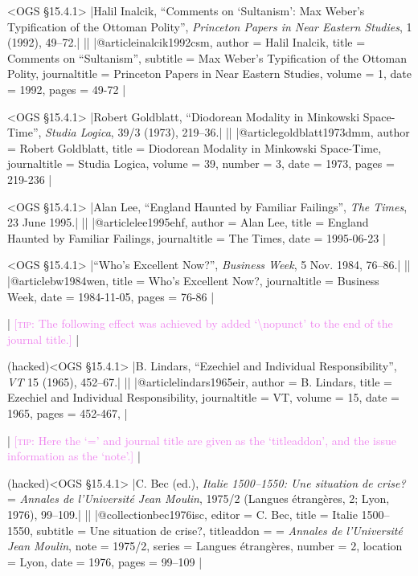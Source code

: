 \documentclass[extrafontsizes,11pt,a4paper,oneside]{memoir}
\newcommand*{\code}[1]{`\textsf{#1}'}
\newcommand*{\aside}[1]{\textcolor{violet}{[\textsc{tip:} #1]}}
\begin{document}
\bibexample<OGS \S15.4.1>
|Halil Inalcik, \enquote{Comments on \enquote{Sultanism}: Max Weber's Typification of the Ottoman Polity}, \emph{Princeton Papers in Near Eastern Studies}, 1 (1992), 49--72.|%
||%
|@article{inalcik1992csm,
  author = {Halil Inalcik},
  title = {Comments on \enquote{Sultanism}},
  subtitle = {Max Weber's Typification of the Ottoman Polity},
  journaltitle = {Princeton Papers in Near Eastern Studies},
  volume = {1},
  date = {1992},
  pages = {49-72}
}|

\bibexample<OGS \S15.4.1>
|Robert Goldblatt, \enquote{Diodorean Modality in Minkowski Space-Time}, \emph{Studia Logica}, 39/3 (1973), 219--36.|%
||%
|@article{goldblatt1973dmm,
  author = {Robert Goldblatt},
  title = {Diodorean Modality in Minkowski Space-Time},
  journaltitle = {Studia Logica},
  volume = {39},
  number = {3},
  date = {1973},
  pages = {219-236}
}|

\bibexample<OGS \S15.4.1>
|Alan Lee, \enquote{England Haunted by Familiar Failings}, \emph{The Times}, 23 June 1995.|%
||%
|@article{lee1995ehf,
  author = {Alan Lee},
  title = {England Haunted by Familiar Failings},
  journaltitle = {The Times},
  date = {1995-06-23}
}|

\bibexample<OGS \S15.4.1>
|\enquote{Who's Excellent Now?}, \emph{Business Week}, 5 Nov. 1984, 76--86.|%
||%
|@article{bw1984wen,
  title = {Who's Excellent Now?},
  journaltitle = {Business Week},
  date = {1984-11-05},
  pages = {76-86}
}|

\todoc|
\aside{The following effect was achieved by added \code{\textbackslash nopunct} to the end of the journal title.}
|

\bibexample(hacked)<OGS \S15.4.1>
|B. Lindars, \enquote{Ezechiel and Individual Responsibility}, \emph{VT} 15 (1965), 452--67.|%
||%
|@article{lindars1965eir,
  author = {B. Lindars},
  title = {Ezechiel and Individual Responsibility},
  journaltitle = {VT\nopunct},
  volume = {15},
  date = {1965},
  pages = {452-467},
}|

\todoc|
\aside{Here the \code{=} and journal title are given as the \code{titleaddon}, and the issue information as the \code{note}.}
|

\bibexample(hacked)<OGS \S15.4.1>
|C. Bec (ed.), \emph{Italie 1500--1550: Une situation de crise?} = \emph{Annales de l'Université Jean Moulin}, 1975/2 (Langues étrangères, 2; Lyon, 1976), 99--109.|%
||%
|@collection{bec1976isc,
  editor = {C. Bec},
  title = {Italie 1500--1550},
  subtitle = {Une situation de crise?\nopunct},
  titleaddon = {= \emph{Annales de l'Université Jean Moulin}},
  note = {1975/2},
  series = {Langues étrangères},
  number = {2},
  location = {Lyon},
  date = {1976},
  pages = {99--109}
}|
\end{document}
